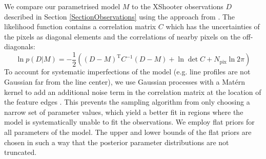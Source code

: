 \documentclass[fleqn,usenatbib]{mnras}
\begin{document}


We compare our parametrised model $M$ to the XShooter observations $D$ described in Section \ref{SectionObservations} using the approach from \citet{2015ApJ...812..128C}. The likelihood function contains a correlation matrix $C$ which has the uncertainties of the pixels as diagonal elements and the correlations of nearby pixels on the off-diagonals:
\small
\begin{equation}
    \ln p(D\vert M) = -\frac{1}{2}\left( (D-M)^\text{T}C^{-1}(D-M) + \ln \det C + N_{\text{pix}}\ln{2\pi}\right)
\end{equation}
\normalsize
To account for systematic imperfections of the model (e.g. line profiles are not Gaussian far from the line center), we use Gaussian processes with a Mat\'ern kernel to add an additional noise term in the correlation matrix at the location of the feature edges \citep[see ][]{2015ApJ...812..128C}. This prevents the sampling algorithm from only choosing a narrow set of parameter values, which yield a better fit in regions where the model is systematically unable to fit the observations. We employ flat priors for all parameters of the model. The upper and lower bounds of the flat priors are chosen in such a way that the posterior parameter distributions are not truncated. 
\end{document}
